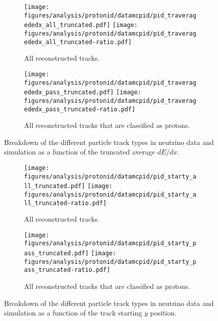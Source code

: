     \begin{figure}[h]
      \centering
      \begin{subfigure}[t]{2.5in}
        \texttt{[image: figures/analysis/protonid/datamcpid/pid\_traveragededx\_all\_truncated.pdf]}
        \texttt{[image: figures/analysis/protonid/datamcpid/pid\_traveragededx\_all\_truncated-ratio.pdf]}
        \caption{All reconstructed tracks.}
      \end{subfigure}
      \hspace{2pt}
      \begin{subfigure}[t]{2.5in}
        \texttt{[image: figures/analysis/protonid/datamcpid/pid\_traveragededx\_pass\_truncated.pdf]}
        \texttt{[image: figures/analysis/protonid/datamcpid/pid\_traveragededx\_pass\_truncated-ratio.pdf]}
        \caption{All reconstructed tracks that are classified as protons.}
      \end{subfigure}
      \caption{Breakdown of the different particle track types in neutrino data
      and simulation as a function of the truncated average $dE/dx$.}
      \label{fig:pidtraveragededx}
    \end{figure}
    \begin{figure}[h]
      \centering
      \begin{subfigure}[t]{2.5in}
        \texttt{[image: figures/analysis/protonid/datamcpid/pid\_starty\_all\_truncated.pdf]}
        \texttt{[image: figures/analysis/protonid/datamcpid/pid\_starty\_all\_truncated-ratio.pdf]}
        \caption{All reconstructed tracks.}
      \end{subfigure}
      \hspace{2pt}
      \begin{subfigure}[t]{2.5in}
        \texttt{[image: figures/analysis/protonid/datamcpid/pid\_starty\_pass\_truncated.pdf]}
        \texttt{[image: figures/analysis/protonid/datamcpid/pid\_starty\_pass\_truncated-ratio.pdf]}
        \caption{All reconstructed tracks that are classified as protons.}
      \end{subfigure}
      \caption{Breakdown of the different particle track types in neutrino data
      and simulation as a function of the track starting $y$ position.}
      \label{fig:pidstarty}
    \end{figure}
